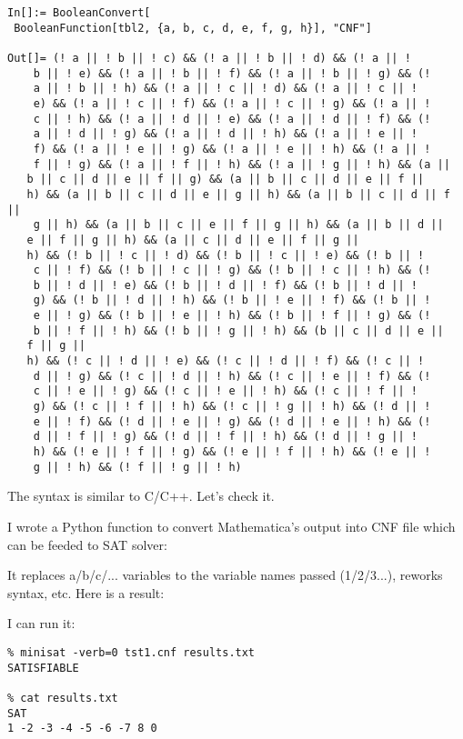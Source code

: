 \begin{lstlisting}
In[]:= BooleanConvert[
 BooleanFunction[tbl2, {a, b, c, d, e, f, g, h}], "CNF"]

Out[]= (! a || ! b || ! c) && (! a || ! b || ! d) && (! a || ! 
    b || ! e) && (! a || ! b || ! f) && (! a || ! b || ! g) && (! 
    a || ! b || ! h) && (! a || ! c || ! d) && (! a || ! c || ! 
    e) && (! a || ! c || ! f) && (! a || ! c || ! g) && (! a || ! 
    c || ! h) && (! a || ! d || ! e) && (! a || ! d || ! f) && (! 
    a || ! d || ! g) && (! a || ! d || ! h) && (! a || ! e || ! 
    f) && (! a || ! e || ! g) && (! a || ! e || ! h) && (! a || ! 
    f || ! g) && (! a || ! f || ! h) && (! a || ! g || ! h) && (a || 
   b || c || d || e || f || g) && (a || b || c || d || e || f || 
   h) && (a || b || c || d || e || g || h) && (a || b || c || d || f ||
    g || h) && (a || b || c || e || f || g || h) && (a || b || d || 
   e || f || g || h) && (a || c || d || e || f || g || 
   h) && (! b || ! c || ! d) && (! b || ! c || ! e) && (! b || ! 
    c || ! f) && (! b || ! c || ! g) && (! b || ! c || ! h) && (! 
    b || ! d || ! e) && (! b || ! d || ! f) && (! b || ! d || ! 
    g) && (! b || ! d || ! h) && (! b || ! e || ! f) && (! b || ! 
    e || ! g) && (! b || ! e || ! h) && (! b || ! f || ! g) && (! 
    b || ! f || ! h) && (! b || ! g || ! h) && (b || c || d || e || 
   f || g || 
   h) && (! c || ! d || ! e) && (! c || ! d || ! f) && (! c || ! 
    d || ! g) && (! c || ! d || ! h) && (! c || ! e || ! f) && (! 
    c || ! e || ! g) && (! c || ! e || ! h) && (! c || ! f || ! 
    g) && (! c || ! f || ! h) && (! c || ! g || ! h) && (! d || ! 
    e || ! f) && (! d || ! e || ! g) && (! d || ! e || ! h) && (! 
    d || ! f || ! g) && (! d || ! f || ! h) && (! d || ! g || ! 
    h) && (! e || ! f || ! g) && (! e || ! f || ! h) && (! e || ! 
    g || ! h) && (! f || ! g || ! h)
\end{lstlisting}

The syntax is similar to C/C++.
Let's check it.

I wrote a Python function to convert Mathematica's output into \ac{CNF} file which can be feeded to SAT solver:



It replaces a/b/c/... variables to the variable names passed (1/2/3...), reworks syntax, etc.
Here is a result:



I can run it:

\begin{lstlisting}
% minisat -verb=0 tst1.cnf results.txt
SATISFIABLE

% cat results.txt
SAT
1 -2 -3 -4 -5 -6 -7 8 0
\end{lstlisting}

